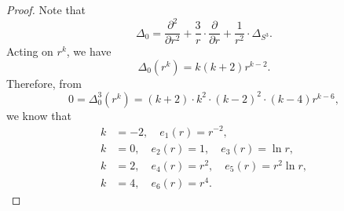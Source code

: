 \documentclass[11pt,letterpaper]{amsart}
\theoremstyle{definition}
\theoremstyle{remark}
\numberwithin{equation}{section}
\begin{document}
\begin{proof}
    Note that
    \begin{equation*}
        \Delta_0=\frac{\partial^2}{\partial r^2}+\frac{3}{r}\cdot\frac{\partial}{\partial r}+\frac{1}{r^2}\cdot \Delta_{S^3}.
    \end{equation*}
Acting on $r^k$, we have
\begin{equation*}
    \Delta_0 (r^k)=k(k+2)r^{k-2}.
\end{equation*}
Therefore, from
\begin{equation*}
    0=\Delta^3_0 (r^k)=(k+2)\cdot k^2 \cdot (k-2)^2\cdot (k-4)r^{k-6},
\end{equation*}
we know that
\begin{equation*}
    \begin{split}
        k&=-2, \quad e_1(r)=r^{-2},\\
        k&=0, \quad e_2(r)=1, \quad e_3(r)=\ln r,\\
        k&=2, \quad e_4(r)=r^2, \quad e_5(r)=r^2\ln r,\\
        k&=4, \quad e_6(r)=r^4.
    \end{split}
\end{equation*}
\end{proof}
\end{document}
